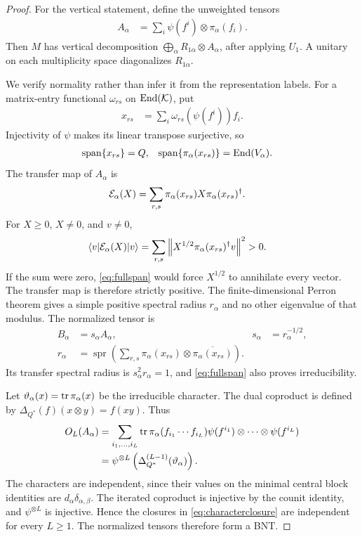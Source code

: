 \documentclass[aps,pra,reprint,nofootinbib,onecolumn]{revtex4-2}
\begin{document}
\begin{proof}
	For the vertical statement, define the unweighted tensors
	\begin{align}
		A_\alpha & =\sum_i\psi(f^i)\otimes\pi_\alpha(f_i).
		\label{eq:unweighted}
	\end{align}
	Then $M$ has vertical decomposition
	$\bigoplus_\alpha R_{1\alpha}\otimes A_\alpha$, after applying $U_1$.
	A unitary on each multiplicity space diagonalizes $R_{1\alpha}$.

	We verify normality rather than infer it from the representation
	labels. For a matrix-entry functional $\omega_{rs}$ on $\operatorname{End}(\mathcal{K})$,
	put
	\begin{align}
		x_{rs} & =\sum_i\omega_{rs}(\psi(f^i))f_i.
	\end{align}
	Injectivity of $\psi$ makes its linear transpose surjective, so
	\begin{align}
		\operatorname{span}\{x_{rs}\}             & =Q,
		                                          &
		\operatorname{span}\{\pi_\alpha(x_{rs})\} & =\operatorname{End}(V_\alpha).
		\label{eq:fullspan}
	\end{align}
	The transfer map of $A_\alpha$ is
	\begin{align}
		\mathcal{E}_\alpha(X)
		 & =\sum_{r,s}\pi_\alpha(x_{rs})X\pi_\alpha(x_{rs})^\dagger.
	\end{align}
	For $X\geq0$, $X\neq0$, and $v\neq0$,
	\begin{align}
		\langle v\rvert\mathcal{E}_\alpha(X)\lvert v\rangle
		 & =\sum_{r,s}
		\left\|X^{1/2}\pi_\alpha(x_{rs})^\dagger v\right\|^2>0.
	\end{align}
	If the sum were zero, \cref{eq:fullspan} would force $X^{1/2}$ to
	annihilate every vector. The transfer map is therefore strictly
	positive. The finite-dimensional Perron theorem gives a simple
	positive spectral radius $r_\alpha$ and no other eigenvalue of that
	modulus. The normalized tensor is
	\begin{align}
		B_\alpha & =s_\alpha A_\alpha,
		         &
		s_\alpha & =r_\alpha^{-1/2},
		\\
		r_\alpha
		         & =\operatorname{spr}\left(\sum_{r,s}\pi_\alpha(x_{rs})
		\otimes\overline{\pi_\alpha(x_{rs})}\right).
		\label{eq:normalization}
	\end{align}
	Its transfer spectral radius is $s_\alpha^2r_\alpha=1$, and
	\cref{eq:fullspan} also proves irreducibility.

	Let $\vartheta_\alpha(x)=\operatorname{tr}\pi_\alpha(x)$ be the irreducible character.
	The dual coproduct is defined by
	$\Delta_{Q^*}(f)(x\otimes y)=f(xy)$. Thus
	\begin{align}
		O_L(A_\alpha)
		 & =\sum_{i_1,\ldots,i_L}
		\operatorname{tr}\pi_\alpha(f_{i_1}\cdots f_{i_L})
		\psi(f^{i_1})\otimes\cdots\otimes\psi(f^{i_L})
		\\
		 & =\psi^{\otimes L}
		\left(\Delta_{Q^*}^{(L-1)}(\vartheta_\alpha)\right).
		\label{eq:characterclosure}
	\end{align}
	The characters are independent, since their values on the minimal
	central block identities are $d_\alpha\delta_{\alpha,\beta}$.
	The iterated coproduct is injective by the counit identity, and
	$\psi^{\otimes L}$ is injective. Hence the closures in
	\cref{eq:characterclosure} are independent for every $L\geq1$.
	The normalized tensors therefore form a BNT.


\end{proof}
\end{document}

